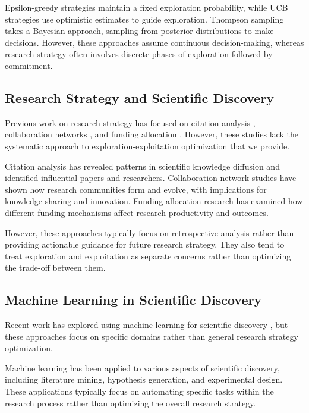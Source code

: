 \documentclass[letterpaper]{article} %
\begin{document}
Epsilon-greedy strategies maintain a fixed exploration probability, while UCB strategies use optimistic estimates to guide exploration. Thompson sampling takes a Bayesian approach, sampling from posterior distributions to make decisions. However, these approaches assume continuous decision-making, whereas research strategy often involves discrete phases of exploration followed by commitment.

\subsection{Research Strategy and Scientific Discovery}

Previous work on research strategy has focused on citation analysis \cite{garfield1979citation}, collaboration networks \cite{newman2001structure}, and funding allocation \cite{azoulay2011incentives}. However, these studies lack the systematic approach to exploration-exploitation optimization that we provide.

Citation analysis has revealed patterns in scientific knowledge diffusion and identified influential papers and researchers. Collaboration network studies have shown how research communities form and evolve, with implications for knowledge sharing and innovation. Funding allocation research has examined how different funding mechanisms affect research productivity and outcomes.

However, these approaches typically focus on retrospective analysis rather than providing actionable guidance for future research strategy. They also tend to treat exploration and exploitation as separate concerns rather than optimizing the trade-off between them.

\subsection{Machine Learning in Scientific Discovery}

Recent work has explored using machine learning for scientific discovery \cite{gil2014amplify,rzhetsky2015choosing}, but these approaches focus on specific domains rather than general research strategy optimization.

Machine learning has been applied to various aspects of scientific discovery, including literature mining, hypothesis generation, and experimental design. These applications typically focus on automating specific tasks within the research process rather than optimizing the overall research strategy.
\end{document}
